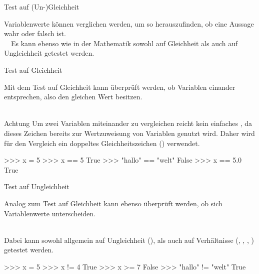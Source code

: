         \begin{frame}[fragile]{Test auf (Un-)Gleichheit}
            
            Variablenwerte können verglichen werden, um so herauszufinden, ob eine Aussage wahr oder falsch ist. \\~\
            Es kann ebenso wie in der Mathematik sowohl auf Gleichheit als auch auf Ungleichheit getestet werden.
            
        \end{frame}
        
        \begin{frame}[fragile]{Test auf Gleichheit}
        
            Mit dem Test auf Gleichheit kann überprüft werden, ob Variablen einander entsprechen, also den gleichen Wert besitzen. \\~\
            
            \begin{alertblock}{Achtung}
            Um zwei Variablen miteinander zu vergleichen reicht kein einfaches \code{=}, da dieses Zeichen bereits zur Wertzuweisung von Variablen genutzt wird. Daher wird für den Vergleich ein doppeltes Gleichheitszeichen (\code{==}) verwendet.
            \end{alertblock}
            
            
\begin{pyconcode}
>>> x = 5
>>> x == 5
True
>>> "hallo" == "welt"
False
>>> x == 5.0
True
\end{pyconcode}     

        \end{frame}
        
        \begin{frame}[fragile]{Test auf Ungleichheit}
        
            Analog zum Test auf Gleichheit kann ebenso überprüft werden, ob sich Variablenwerte unterscheiden. \\~\
            
            Dabei kann sowohl allgemein auf Ungleichheit (\code{!=}), als auch auf Verhältnisse (\code{>}, \code{<}, \code{>=}, \code{<=}) getestet werden.
            
\begin{pyconcode}
>>> x = 5
>>> x != 4
True
>>> x >= 7
False
>>> "hallo" != "welt"
True
\end{pyconcode}     

        \end{frame}
        
